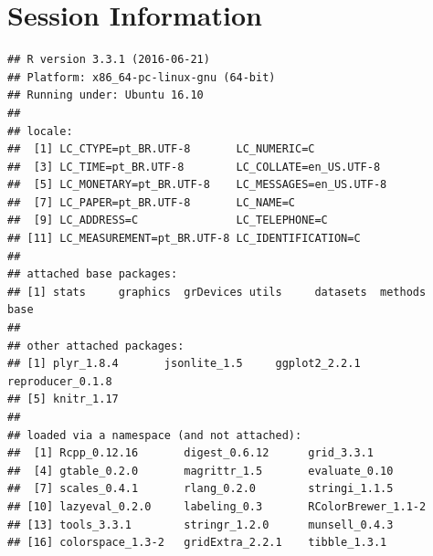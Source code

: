 \documentclass{article}\usepackage[]{graphicx}\usepackage[]{color}
\makeatletter
\newenvironment{kframe}{%
 \def\at@end@of@kframe{}%
 \ifinner\ifhmode%
  \def\at@end@of@kframe{\end{minipage}}%
  \begin{minipage}{\columnwidth}%
 \fi\fi%
 \def\FrameCommand##1{\hskip\@totalleftmargin \hskip-\fboxsep
 \colorbox{shadecolor}{##1}\hskip-\fboxsep
     \hskip-\linewidth \hskip-\@totalleftmargin \hskip\columnwidth}%
 \MakeFramed {\advance\hsize-\width
   \@totalleftmargin\z@ \linewidth\hsize
   \@setminipage}}%
 {\par\unskip\endMakeFramed%
 \at@end@of@kframe}
\newenvironment{knitrout}{}{} %
\makeatother
\begin{document}
\section{Session Information}
\begin{knitrout}
\color{fgcolor}\begin{kframe}
\begin{verbatim}
## R version 3.3.1 (2016-06-21)
## Platform: x86_64-pc-linux-gnu (64-bit)
## Running under: Ubuntu 16.10
## 
## locale:
##  [1] LC_CTYPE=pt_BR.UTF-8       LC_NUMERIC=C              
##  [3] LC_TIME=pt_BR.UTF-8        LC_COLLATE=en_US.UTF-8    
##  [5] LC_MONETARY=pt_BR.UTF-8    LC_MESSAGES=en_US.UTF-8   
##  [7] LC_PAPER=pt_BR.UTF-8       LC_NAME=C                 
##  [9] LC_ADDRESS=C               LC_TELEPHONE=C            
## [11] LC_MEASUREMENT=pt_BR.UTF-8 LC_IDENTIFICATION=C       
## 
## attached base packages:
## [1] stats     graphics  grDevices utils     datasets  methods   base     
## 
## other attached packages:
## [1] plyr_1.8.4       jsonlite_1.5     ggplot2_2.2.1    reproducer_0.1.8
## [5] knitr_1.17      
## 
## loaded via a namespace (and not attached):
##  [1] Rcpp_0.12.16       digest_0.6.12      grid_3.3.1        
##  [4] gtable_0.2.0       magrittr_1.5       evaluate_0.10     
##  [7] scales_0.4.1       rlang_0.2.0        stringi_1.1.5     
## [10] lazyeval_0.2.0     labeling_0.3       RColorBrewer_1.1-2
## [13] tools_3.3.1        stringr_1.2.0      munsell_0.4.3     
## [16] colorspace_1.3-2   gridExtra_2.2.1    tibble_1.3.1
\end{verbatim}
\end{kframe}
\end{knitrout}
\end{document}
